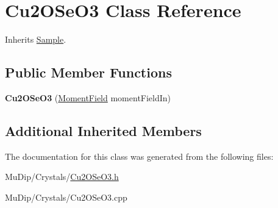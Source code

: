 \hypertarget{class_cu2_o_se_o3}{}\section{Cu2\+O\+Se\+O3 Class Reference}
\label{class_cu2_o_se_o3}


Inherits \mbox{\hyperlink{class_sample}{Sample}}.

\subsection*{Public Member Functions}
\begin{DoxyCompactItemize}
\item 
\mbox{\label{class_cu2_o_se_o3_ae23b756707e508607a52e11301fca560}} 
{\bfseries Cu2\+O\+Se\+O3} (\mbox{\hyperlink{class_moment_field}{Moment\+Field}} moment\+Field\+In)
\end{DoxyCompactItemize}
\subsection*{Additional Inherited Members}


The documentation for this class was generated from the following files\+:\begin{DoxyCompactItemize}
\item 
Mu\+Dip/\+Crystals/\mbox{\hyperlink{_cu2_o_se_o3_8h}{Cu2\+O\+Se\+O3.\+h}}\item 
Mu\+Dip/\+Crystals/Cu2\+O\+Se\+O3.\+cpp\end{DoxyCompactItemize}
